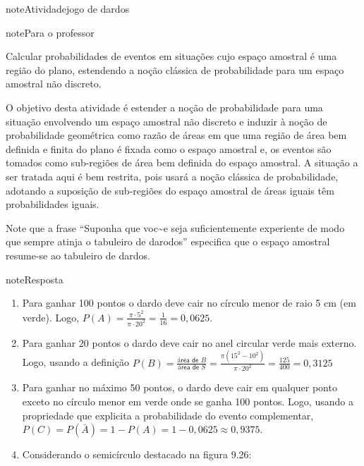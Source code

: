 \begin{sphinxadmonition}{note}{Atividade}{jogo de dardos}
\label{ativ-probabilidade-geometrica}

\begin{sphinxadmonition}{note}{Para o professor}

  Calcular probabilidades de eventos em situações cujo espaço amostral é uma região do plano, estendendo a noção clássica de probabilidade para um espaço amostral não discreto.

 O objetivo desta atividade é estender a noção de probabilidade para uma situação envolvendo um espaço amostral não discreto e induzir à noção de probabilidade geométrica como razão de áreas em que uma região de área bem definida e finita do plano é fixada como o espaço amostral e, os eventos são tomados como sub-regiões de área bem definida do espaço amostral. A situação a ser tratada aqui é bem restrita, pois usará a noção clássica de probabilidade, adotando a suposição de sub-regiões do espaço amostral de áreas iguais têm probabilidades iguais.

Note que a frase “Suponha que voc\textasciitilde{}e seja suficientemente experiente de modo que sempre atinja o tabuleiro de darodos” especifica que o espaço amostral resume-se ao tabuleiro de dardos.

\begin{sphinxadmonition}{note}{Resposta}

\begin{enumerate}
\item {} 
Para ganhar 100 pontos o dardo deve cair no círculo menor de raio 5 cm (em verde). Logo, \(P(A)=\frac{\pi \cdot 5^2}{\pi \cdot 20^2}=\frac{1}{16}=0,0625\).

\item {} 
Para ganhar 20 pontos o dardo deve cair no anel circular verde mais externo. Logo, usando a definição \(P(B)=\frac{\textsf{área de }B}{\textsf{área de }S}=\frac{\pi(15^2-10^2)}{\pi\cdot 20^2}=\frac{125}{400}=0,3125\)

\item {} 
Para ganhar no máximo 50 pontos, o dardo deve cair em qualquer ponto exceto no círculo menor em verde onde se ganha 100 pontos. Logo, usando a propriedade que explicita a probabilidade do evento complementar, \(P(C)=P(\bar{A})=1-P(A)=1-0,0625\approx 0,9375\).

\item {} 
Considerando o semicírculo destacado na figura 9.26:


\end{enumerate}
\end{sphinxadmonition}
\end{sphinxadmonition}
\end{sphinxadmonition}
